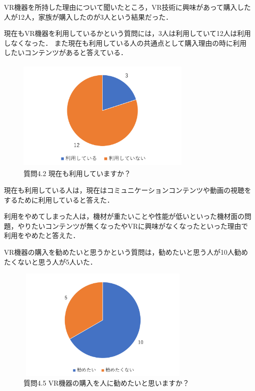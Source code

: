 \documentclass[12pt,a4j]{ltjsarticle}
\begin{document}
VR機器を所持した理由について聞いたところ，VR技術に興味があって購入した人が12人，家族が購入したのが3人という結果だった．

現在もVR機器を利用しているかという質問には，3人は利用していて12人は利用しなくなった．
また現在も利用している人の共通点として購入理由の時に利用したいコンテンツがあると答えている．
\begin{figure}[h]
\begin{center}
 \includegraphics[clip,width=85mm,height=55mm]{アンケート結果1_4_2.pdf}
\end{center}
 \caption{質問4.2 現在も利用していますか？}
 \label{fig:アンケート結果1_4_2.pdf}
\end{figure}

現在も利用している人は，現在はコミュニケーションコンテンツや動画の視聴をするために利用していると答えた．

利用をやめてしまった人は，機材が重たいことや性能が低いといった機材面の問題，やりたいコンテンツが無くなったやVRに興味がなくなったといった理由で利用をやめたと答えた．

VR機器の購入を勧めたいと思うかという質問は，勧めたいと思う人が10人勧めたくないと思う人が5人いた．
\begin{figure}[h]
\begin{center}
 \includegraphics[clip,width=85mm,height=55mm]{アンケート結果1_4_5.pdf}
\end{center}
 \caption{質問4.5 VR機器の購入を人に勧めたいと思いますか？}
 \label{fig:アンケート結果1_4_5.pdf}
\end{figure}
\end{document}
